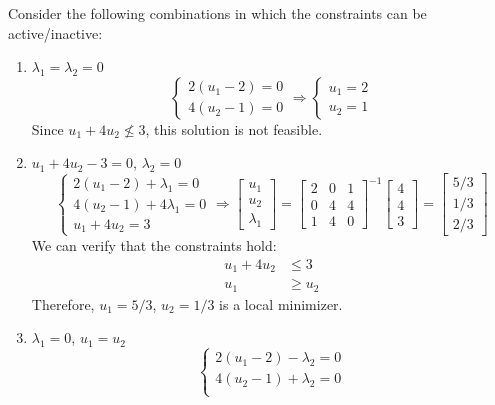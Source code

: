 \documentclass[letterpaper,12pt,titlepage]{article}
\begin{document}
\begin{enumerate}[leftmargin=0pt]
  Consider the following combinations in which the constraints can be active/inactive:
  \begin{enumerate}
  \item $\lambda_1=\lambda_2=0$
    \[ \begin{cases}
        2(u_1-2) = 0 \\
        4(u_2-1) = 0
      \end{cases} \Longrightarrow
      \begin{cases}
        u_1 = 2 \\
        u_2 = 1
      \end{cases} \]
    Since $u_1+4u_2 \nleq 3$, this solution is not feasible.
  \item $u_1+4u_2-3 = 0$, $\lambda_2=0$
    \[ \begin{cases}
        2(u_1-2) + \lambda_1 = 0 \\
        4(u_2-1) + 4\lambda_1 = 0 \\
        u_1 + 4u_2 = 3
      \end{cases} \Longrightarrow
      \begin{bmatrix} u_1 \\ u_2 \\ \lambda_1 \end{bmatrix} =
      \begin{bmatrix}
        2 & 0 & 1 \\
        0 & 4 & 4 \\
        1 & 4 & 0
      \end{bmatrix}^{-1}
      \begin{bmatrix}
        4 \\ 4 \\ 3
      \end{bmatrix} =
      \begin{bmatrix}
        5/3 \\ 1/3 \\ 2/3
      \end{bmatrix}
    \]
    We can verify that the constraints hold:
    \begin{align}
      u_1 + 4u_2 &\le 3 \\
      u_1 &\ge u_2
    \end{align}
    Therefore, $u_1=5/3$, $u_2=1/3$ is a local minimizer.
  \item $\lambda_1=0$, $u_1=u_2$
    \[ \begin{cases}
        2(u_1-2) - \lambda_2 = 0 \\
        4(u_2-1) + \lambda_2 = 0 \\

\end{cases}\]
\end{enumerate}
\end{enumerate}
\end{document}
